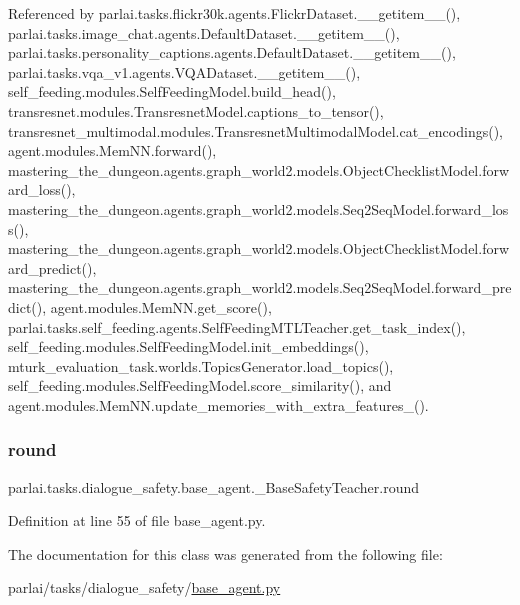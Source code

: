 Referenced by parlai.\+tasks.\+flickr30k.\+agents.\+Flickr\+Dataset.\+\_\+\+\_\+getitem\+\_\+\+\_\+(), parlai.\+tasks.\+image\+\_\+chat.\+agents.\+Default\+Dataset.\+\_\+\+\_\+getitem\+\_\+\+\_\+(), parlai.\+tasks.\+personality\+\_\+captions.\+agents.\+Default\+Dataset.\+\_\+\+\_\+getitem\+\_\+\+\_\+(), parlai.\+tasks.\+vqa\+\_\+v1.\+agents.\+V\+Q\+A\+Dataset.\+\_\+\+\_\+getitem\+\_\+\+\_\+(), self\+\_\+feeding.\+modules.\+Self\+Feeding\+Model.\+build\+\_\+head(), transresnet.\+modules.\+Transresnet\+Model.\+captions\+\_\+to\+\_\+tensor(), transresnet\+\_\+multimodal.\+modules.\+Transresnet\+Multimodal\+Model.\+cat\+\_\+encodings(), agent.\+modules.\+Mem\+N\+N.\+forward(), mastering\+\_\+the\+\_\+dungeon.\+agents.\+graph\+\_\+world2.\+models.\+Object\+Checklist\+Model.\+forward\+\_\+loss(), mastering\+\_\+the\+\_\+dungeon.\+agents.\+graph\+\_\+world2.\+models.\+Seq2\+Seq\+Model.\+forward\+\_\+loss(), mastering\+\_\+the\+\_\+dungeon.\+agents.\+graph\+\_\+world2.\+models.\+Object\+Checklist\+Model.\+forward\+\_\+predict(), mastering\+\_\+the\+\_\+dungeon.\+agents.\+graph\+\_\+world2.\+models.\+Seq2\+Seq\+Model.\+forward\+\_\+predict(), agent.\+modules.\+Mem\+N\+N.\+get\+\_\+score(), parlai.\+tasks.\+self\+\_\+feeding.\+agents.\+Self\+Feeding\+M\+T\+L\+Teacher.\+get\+\_\+task\+\_\+index(), self\+\_\+feeding.\+modules.\+Self\+Feeding\+Model.\+init\+\_\+embeddings(), mturk\+\_\+evaluation\+\_\+task.\+worlds.\+Topics\+Generator.\+load\+\_\+topics(), self\+\_\+feeding.\+modules.\+Self\+Feeding\+Model.\+score\+\_\+similarity(), and agent.\+modules.\+Mem\+N\+N.\+update\+\_\+memories\+\_\+with\+\_\+extra\+\_\+features\+\_\+().

\mbox{\label{classparlai_1_1tasks_1_1dialogue__safety_1_1base__agent_1_1__BaseSafetyTeacher_a3de49870b976f3f356d43d18bdee3206}} 
\subsubsection{\texorpdfstring{round}{round}}
{\footnotesize\ttfamily parlai.\+tasks.\+dialogue\+\_\+safety.\+base\+\_\+agent.\+\_\+\+Base\+Safety\+Teacher.\+round}



Definition at line 55 of file base\+\_\+agent.\+py.



The documentation for this class was generated from the following file\+:\begin{DoxyCompactItemize}
\item 
parlai/tasks/dialogue\+\_\+safety/\hyperlink{base__agent_8py}{base\+\_\+agent.\+py}\end{DoxyCompactItemize}
